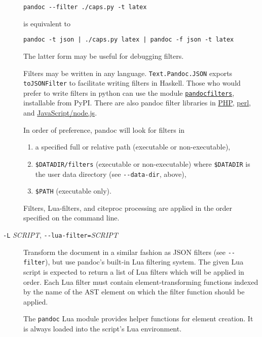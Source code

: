 \documentclass[
]{article}
\begin{document}
\begin{description}
\begin{verbatim}
pandoc --filter ./caps.py -t latex
\end{verbatim}

is equivalent to

\begin{verbatim}
pandoc -t json | ./caps.py latex | pandoc -f json -t latex
\end{verbatim}

The latter form may be useful for debugging filters.

Filters may be written in any language. \texttt{Text.Pandoc.JSON}
exports \texttt{toJSONFilter} to facilitate writing filters in Haskell.
Those who would prefer to write filters in python can use the module
\href{https://github.com/jgm/pandocfilters}{\texttt{pandocfilters}},
installable from PyPI. There are also pandoc filter libraries in
\href{https://github.com/vinai/pandocfilters-php}{PHP},
\href{https://metacpan.org/pod/Pandoc::Filter}{perl}, and
\href{https://github.com/mvhenderson/pandoc-filter-node}{JavaScript/node.js}.

In order of preference, pandoc will look for filters in

\begin{enumerate}
\def\labelenumi{\arabic{enumi}.}
\item
  a specified full or relative path (executable or non-executable),
\item
  \texttt{\$DATADIR/filters} (executable or non-executable) where
  \texttt{\$DATADIR} is the user data directory (see
  \texttt{-\/-data-dir}, above),
\item
  \texttt{\$PATH} (executable only).
\end{enumerate}

Filters, Lua-filters, and citeproc processing are applied in the order
specified on the command line.
\item[\texttt{-L} \emph{SCRIPT}, \texttt{-\/-lua-filter=}\emph{SCRIPT}]
Transform the document in a similar fashion as JSON filters (see
\texttt{-\/-filter}), but use pandoc's built-in Lua filtering system.
The given Lua script is expected to return a list of Lua filters which
will be applied in order. Each Lua filter must contain
element-transforming functions indexed by the name of the AST element on
which the filter function should be applied.

The \texttt{pandoc} Lua module provides helper functions for element
creation. It is always loaded into the script's Lua environment.


\end{description}
\end{document}

